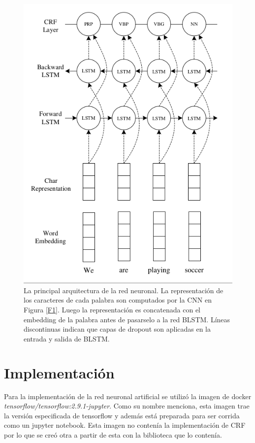 \documentclass[runningheads]{llncs}
\begin{document}
\begin{figure}
	\centering
	\includegraphics[width=12cm]{Fig_3.png}
	\caption{ La principal arquitectura de la red neuronal.
		La representación de los caracteres de cada palabra
		son computados por la CNN en Figura \ref{F1}. Luego
		la representación es concatenada con el embedding de
		la palabra antes de pasarselo a la red BLSTM. Líneas
		discontinuas indican que capas de dropout son aplicadas
		en la entrada y salida de BLSTM.}
	\label{F3}
\end{figure}


\section{Implementación}

Para la implementación de la red neuronal artificial se utilizó la imagen de docker
\emph{tensorflow/tensorflow:2.9.1-jupyter}. Como su nombre menciona, esta imagen
trae la versión especificada de tensorflow y además está preparada para ser corrida
como un jupyter notebook. Esta imagen no contenía la implementación de CRF por lo que
se creó otra a partir de esta con la biblioteca que lo contenía.
\end{document}

